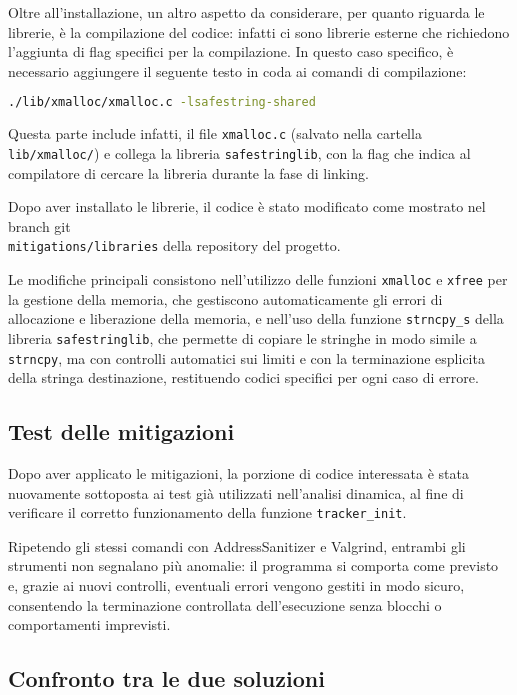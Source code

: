 \medskip
Oltre all'installazione, un altro aspetto da considerare, per quanto riguarda le
librerie, è la compilazione del codice: infatti ci sono librerie esterne che
richiedono l'aggiunta di flag specifici per la compilazione. In questo caso specifico,
è necessario aggiungere il seguente testo in coda ai comandi di compilazione: \begin{lstlisting}[language=bash, numbers=none]
./lib/xmalloc/xmalloc.c -lsafestring-shared
\end{lstlisting}
Questa parte include infatti, il file \texttt{xmalloc.c} (salvato nella cartella
\texttt{lib/xmalloc/}) e collega la libreria \texttt{safestringlib}, con la flag
che indica al compilatore di cercare la libreria durante la fase di linking.

Dopo aver installato le librerie, il codice è stato modificato come mostrato nel
branch git \\ \texttt{mitigations/libraries} della repository del progetto.

Le modifiche principali consistono nell'utilizzo delle funzioni \texttt{xmalloc}
e \texttt{xfree} per la gestione della memoria, che gestiscono automaticamente gli
errori di allocazione e liberazione della memoria, e nell'uso della funzione
\texttt{strncpy\_s} della libreria \texttt{safestringlib}, che permette di copiare
le stringhe in modo simile a \texttt{strncpy}, ma con controlli automatici sui limiti
e con la terminazione esplicita della stringa destinazione, restituendo codici
specifici per ogni caso di errore.

\subsection*{Test delle mitigazioni}
\label{sec:test-mitigations}

Dopo aver applicato le mitigazioni, la porzione di codice interessata è stata
nuovamente sottoposta ai test già utilizzati nell'analisi dinamica, al fine di verificare
il corretto funzionamento della funzione \texttt{tracker\_init}.

Ripetendo gli stessi comandi con AddressSanitizer e Valgrind, entrambi gli strumenti
non segnalano più anomalie: il programma si comporta come previsto e, grazie ai nuovi
controlli, eventuali errori vengono gestiti in modo sicuro, consentendo la terminazione
controllata dell'esecuzione senza blocchi o comportamenti imprevisti.

\subsection*{Confronto tra le due soluzioni}
\label{sec:comparison-case-study}

